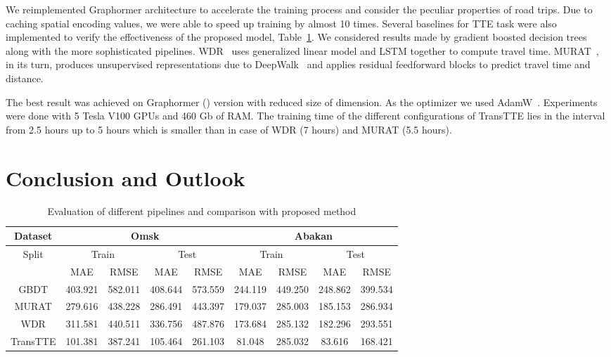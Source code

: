 \documentclass{svproc}
\begin{document}
We reimplemented Graphormer architecture to accelerate the training process and consider the peculiar properties of road trips. Due to caching spatial encoding values, we were able to speed up training by almost 10 times. Several baselines for TTE task were also implemented to verify the effectiveness of the proposed model, Table~\ref{tab:results}. We considered results made by gradient boosted decision trees along with the more sophisticated pipelines. WDR~\cite{wdr} uses generalized linear model and LSTM together to compute travel time. MURAT~\cite{murat}, in its turn, produces unsupervised representations due to DeepWalk~\cite{deepwalk} and applies residual feedforward blocks to predict travel time and distance. 

The best result was achieved on Graphormer () version with reduced size of dimension.
As the optimizer we used AdamW~\cite{AdamW}. Experiments were done with 5 Tesla V100 GPUs and 460 Gb of RAM. The training time of the different  configurations of TransTTE lies in the interval from 2.5 hours up to 5 hours which is smaller than in case of WDR (7 hours) and MURAT (5.5 hours).

\section{Conclusion and Outlook}

\begin{table}[t] 
\centering
\begin{tabular}{c|c|cc|cc|cc|cc}
\toprule
\toprule
\multicolumn{2}{c|}{ Dataset } & \multicolumn{4}{c|}{Omsk} & \multicolumn{4}{c}{Abakan} \\
\midrule
\multicolumn{2}{c|}{Split} & \multicolumn{2}{c|}{Train} & \multicolumn{2}{c|}{Test} & \multicolumn{2}{c|}{Train} & \multicolumn{2}{c}{Test}\\
\midrule
\multicolumn{2}{c|}{} & MAE & RMSE & MAE & RMSE & MAE & RMSE & MAE & RMSE\\
\midrule
\multicolumn{2}{c|}{GBDT} & 403.921 & 582.011 & 408.644 & 573.559 & 244.119 & 449.250 & 248.862 & 399.534\\
\multicolumn{2}{c|}{MURAT} & 279.616 & 438.228 & 286.491 & 443.397 & 179.037 & 285.003 & 185.153 & 286.934 \\
\multicolumn{2}{c|}{WDR} & 311.581 & 440.511 & 336.756 & 487.876 & 173.684 & 285.132 & 182.296 & 293.551 \\
\midrule
\multicolumn{2}{c|}{TransTTE} & 101.381 & 387.241 & 105.464 & 261.103 & 81.048 & 285.032 & 83.616 & 168.421\\
\bottomrule
\bottomrule
\end{tabular}
\caption{Evaluation of different pipelines and comparison with proposed method}
\label{tab:results}
\end{table}
\end{document}

